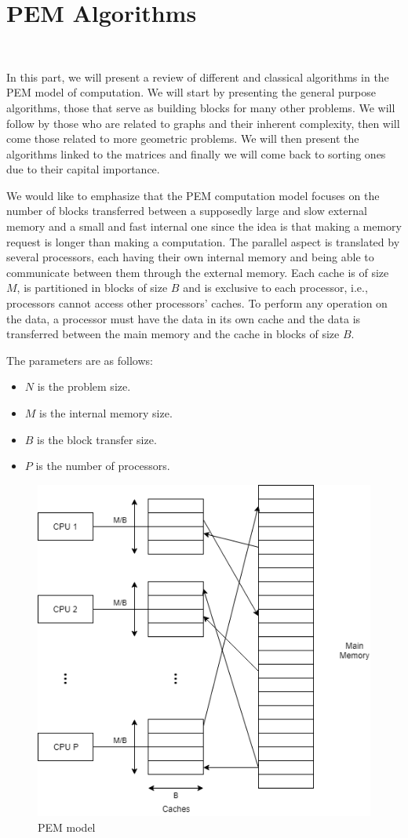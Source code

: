 \chapter{PEM Algorithms}~\label{PEM}

In this part, we will present a review of different and classical algorithms in the PEM model of computation. We will start by presenting the general purpose algorithms, those that serve as building blocks for many other problems. We will follow by those who are related to graphs and their inherent complexity, then will come those related to more geometric problems. We will then present the algorithms linked to the matrices and finally we will come back to sorting ones due to their capital importance.

We would like to emphasize that the PEM computation model focuses on the number of blocks transferred between a supposedly large and slow external memory and a small and fast internal one since the idea is that making a memory request is longer than making a computation. The parallel aspect is translated by several processors, each having their own internal memory and being able to communicate between them through the external memory. Each cache is of size $M$, is partitioned in blocks of size $B$ and is exclusive to each processor, i.e., processors cannot access other processors' caches. To
perform any operation on the data, a processor must have the data in its own cache and the data is transferred between the main memory and the cache in blocks of size $B$.

The parameters are as follows:
\begin{itemize}[label={}]
    \item $N$ is the problem size.
    \item $M$ is the internal memory size.
    \item $B$ is the block transfer size.
    \item $P$ is the number of processors.
\end{itemize}

\begin{figure}[!htb]
    \centering
    \includegraphics[width=0.4\linewidth]{Chapters/GPU/PEM.png} 
    \caption{PEM model}
\end{figure}

